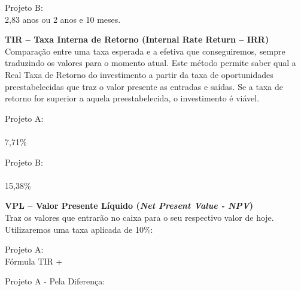Projeto B: \
           \keystroke{$\div$} \\
2,83 anos ou 2 anos e 10 meses.

\textbf{TIR – Taxa Interna de Retorno (Internal Rate Return – IRR)} \\
Comparação entre uma taxa esperada e a efetiva que conseguiremos, sempre traduzindo os valores para o momento atual. Este método permite saber qual a Real Taxa de Retorno do investimento a partir da taxa de oportunidades preestabelecidas que traz o valor presente as entradas e saídas. Se a taxa de retorno for superior a aquela preestabelecida, o investimento é viável.

Projeto A: \\
                   \\
7,71\%

Projeto B: \\
                    \\
15,38\%

\textbf{VPL – Valor Presente Líquido (\textit{Net Present Value - NPV})} \\
Traz os valores que entrarão no caixa para o seu respectivo valor de hoje. Utilizaremos uma taxa aplicada de 10\%:

Projeto A: \\
Fórmula TIR +      

Projeto A - Pela Diferença: \\
                 \keystroke{$-$}

